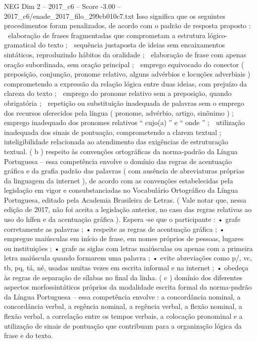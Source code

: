 \begin{textsample}{NEG Dim 2 – 2017\_c6 – Score -3.00 – 2017\_c6/enade\_2017\_filo\_299cb010c7.txt}
Isso significa que os seguintes procedimentos foram penalizados, de acordo com o padrão de resposta proposto :  elaboração de frases fragmentadas que comprometam a estrutura lógico-gramatical do texto ;  sequência justaposta de ideias sem encaixamentos sintáticos, reproduzindo hábitos da oralidade ;  elaboração de frase com apenas oração subordinada, sem oração principal ;  emprego equivocado do conector ( preposição, conjunção, pronome relativo, alguns advérbios e locuções adverbiais ) comprometendo a expressão da relação lógica entre duas ideias, com prejuízo da clareza do texto ;  emprego do pronome relativo sem a preposição, quando obrigatória ;  repetição ou substituição inadequada de palavras sem o emprego dos recursos oferecidos pela língua ( pronome, advérbio, artigo, sinônimo ) ;  emprego inadequado dos pronomes relativos “ cujo(a) ” e “ onde ” ;  utilização inadequada dos sinais de pontuação, comprometendo a clareza textual ;  inteligibilidade relacionada ao atendimento das exigências de estruturação textual. ( b ) respeito às convenções ortográficas da norma-padrão da Língua Portuguesa – essa competência envolve o domínio das regras de acentuação gráfica e da grafia padrão das palavras ( com ausência de abreviaturas próprias da linguagem da internet ), de acordo com as convenções estabelecidas pela legislação em vigor e consubstanciadas no Vocabulário Ortográfico da Língua Portuguesa, editado pela Academia Brasileira de Letras. ( Vale notar que, nessa edição de 2017, não foi aceita a legislação anterior, no caso das regras relativas ao uso do hífen e da acentuação gráfica ).
Espera -se que o participante : • grafe corretamente as palavras ; • respeite as regras de acentuação gráfica ; • empregue maiúsculas em início de frase, em nomes próprios de pessoas, lugares ou instituições ; • grafe as siglas com letras maiúsculas ou apenas com a primeira letra maiúscula quando formarem uma palavra ; • evite abreviações como p/, vc, tb, pq, tá, né, usadas muitas vezes em escrita informal e na internet ; • obedeça às regras de separação de sílabas no final da linha. ( c ) domínio dos diferentes aspectos morfossintáticos próprios da modalidade escrita formal da norma-padrão da Língua Portuguesa – essa competência envolve : a concordância nominal, a concordância verbal, a regência nominal, a regência verbal, a flexão nominal, a flexão verbal, a correlação entre os tempos verbais, a colocação pronominal e a utilização de sinais de pontuação que contribuam para a organização lógica da frase e do texto.

\end{textsample}
